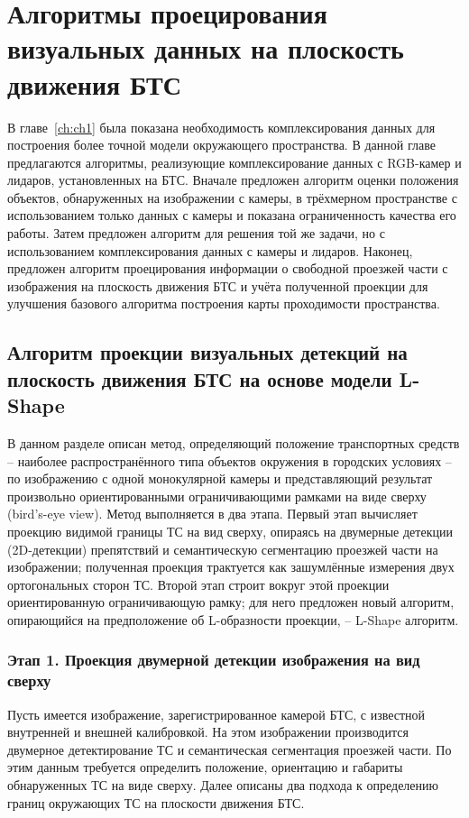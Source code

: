 \chapter{Алгоритмы проецирования визуальных данных на плоскость движения БТС}\label{ch:ch2}

В главе~\cref{ch:ch1} была показана необходимость комплексирования данных для построения более точной модели окружающего пространства. В данной главе предлагаются алгоритмы, реализующие комплексирование данных с RGB-камер и лидаров, установленных на БТС. Вначале предложен алгоритм оценки положения объектов, обнаруженных на изображении с камеры, в трёхмерном пространстве с использованием только данных с камеры и показана ограниченность качества его работы. Затем предложен алгоритм для решения той же задачи, но с использованием комплексирования данных с камеры и лидаров. Наконец, предложен алгоритм проецирования информации о свободной проезжей части с изображения на плоскость движения БТС и учёта полученной проекции для улучшения базового алгоритма построения карты проходимости пространства.

\section{Алгоритм проекции визуальных детекций на плоскость движения БТС на основе модели L-Shape}\label{sec:ch2/sec1}

В данном разделе описан метод, определяющий положение транспортных средств -- наиболее распространённого типа объектов окружения в городских условиях -- по изображению с одной монокулярной камеры и представляющий результат произвольно ориентированными ограничивающими рамками на виде сверху (bird's-eye view). Метод выполняется в два этапа. Первый этап вычисляет проекцию видимой границы ТС на вид сверху, опираясь на двумерные детекции (2D-детекции) препятствий и семантическую сегментацию проезжей части на изображении; полученная проекция трактуется как зашумлённые измерения двух ортогональных сторон ТС. Второй этап строит вокруг этой проекции ориентированную ограничивающую рамку; для него предложен новый алгоритм, опирающийся на предположение об L-образности проекции, -- L-Shape алгоритм.

\subsection{Этап 1. Проекция двумерной детекции изображения на вид сверху}\label{sec:ch2/sec1.1}

Пусть имеется изображение, зарегистрированное камерой БТС, с известной внутренней и внешней калибровкой. На этом изображении
производится двумерное детектирование ТС и семантическая сегментация проезжей части. По этим данным требуется определить положение, ориентацию и габариты обнаруженных ТС на виде сверху. Далее описаны два подхода к определению границ окружающих ТС на плоскости движения БТС. 

